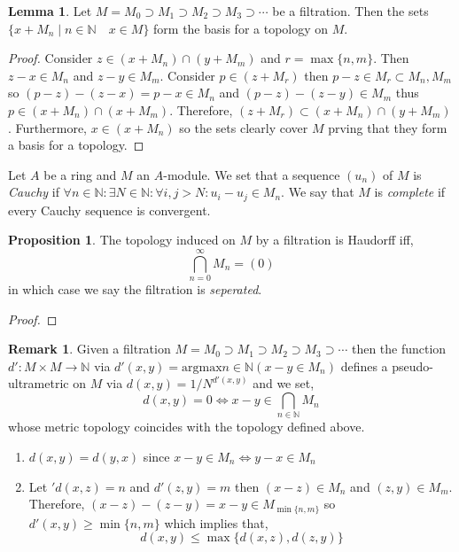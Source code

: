 \documentclass[12pt]{extarticle}
\newcommand{\N}{\mathbb{N}}
\theoremstyle{definition}
\newtheorem{lemma}[theorem]{Lemma}
\newtheorem{proposition}[theorem]{Proposition}
\newtheorem{remark}{Remark}
\newenvironment{definition}[1][Definition:]{\begin{trivlist}
\item[\hskip \labelsep {\bfseries #1}]}{\end{trivlist}}
\begin{document}
\begin{lemma}
Let $M = M_0 \supset M_1 \supset M_2 \supset M_3 \supset \cdots$ be a filtration. Then the sets $\{ x + M_n \mid n \in \N \quad x \in M \}$ form the basis for a topology on $M$.
\end{lemma}

\begin{proof}
Consider $z \in (x + M_n) \cap (y + M_m)$ and $r = \max{\{n, m \}}$. Then $z - x \in M_n$ and $z - y \in M_m$. Consider $p \in (z + M_r)$ then $p - z \in M_r \subset M_n, M_m$ so $(p - z) - (z - x) = p - x \in M_n$ and $(p - z) - (z - y) \in M_m$ thus $p \in (x + M_n) \cap (x + M_m)$. Therefore, $(z + M_r) \subset (x + M_n) \cap (y + M_m)$. Furthermore, $x \in (x + M_n)$ so the sets clearly cover $M$ prving that they form a basis for a topology.
\end{proof}

\begin{definition}
Let $A$ be a ring and $M$ an $A$-module. We set that a sequence $(u_n)$ of $M$ is \textit{Cauchy} if $\forall n \in \N : \exists N \in \N : \forall i, j > N : u_i - u_j \in M_n$. We say that $M$ is \textit{complete} if every Cauchy sequence is convergent.
\end{definition}

\begin{proposition}
The topology induced on $M$ by a filtration is Haudorff iff,
\[ \bigcap_{n = 0}^\infty M_n = (0) \]
in which case we say the filtration is \textit{seperated}.
\end{proposition}

\begin{proof}

\end{proof}

\begin{remark}
Given a filtration $M = M_0 \supset M_1 \supset M_2 \supset M_3 \supset \cdots$ then the function $d' : M \times M \to \N$ via $d'(x, y) = \mathrm{argmax}{n \in \N} (x - y \in M_n)$ defines a pseudo-ultrametric on $M$ via $d(x, y) = 1/N^{d'(x,y)}$ and we set,
\[ d(x, y) = 0 \iff x - y \in \bigcap_{n \in \N} M_n \]
whose metric topology coincides with the topology defined above. 
\begin{enumerate}
\item $d(x, y) = d(y, x)$ since $x - y \in M_n \iff y - x \in M_n$
\item Let $'d(x, z) = n$ and $d'(z, y) = m$ then $(x - z) \in M_n$ and $(z, y) \in M_m$. Therefore, $(x - z) - (z - y) = x - y \in M_{\min{\{ n, m \}}}$ so $d'(x, y) \ge \min{\{n , m \}}$ which implies that,
\[ d(x, y) \le \max{\{ d(x, z), d(z, y) \}} \]
\end{enumerate}
\end{remark}
\end{document}
